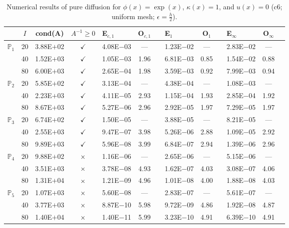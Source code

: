 \begin{table}[H]
\centering
\caption{Numerical results of pure diffusion for $\phi(x)=\exp(x)$, $\kappa(x)=1$, and $u(x)=0$ (c6; uniform mesh; $\epsilon=\frac{h}{2}$).}
\begin{tabular}{@{}l c c c l c c l c c l c c@{}}
\toprule
 & $I$ & cond(A) & $A^{-1}\geq 0$ &  E$_{c,1}$ & O$_{c,1}$ && E$_1$ & O$_1$ && E$_{\infty}$ & O$_{\infty}$\\
\midrule
\multirow{3}{*}{$\mathbb{P}_{1}$}
 & 20 & 3.88E$+$02 & $\checkmark$ & 4.08E$-$03 & --- && 1.23E$-$02 & --- && 2.83E$-$02 & ---\\
 & 40 & 1.52E$+$03 & $\checkmark$ & 1.05E$-$03 & 1.96 && 6.81E$-$03 & 0.85 && 1.54E$-$02 & 0.88\\
 & 80 & 6.00E$+$03 & $\checkmark$ & 2.65E$-$04 & 1.98 && 3.59E$-$03 & 0.92 && 7.99E$-$03 & 0.94\\
\midrule
\multirow{3}{*}{$\mathbb{P}_{2}$}
 & 20 & 5.85E$+$02 & $\checkmark$ & 3.13E$-$04 & --- && 4.38E$-$04 & --- && 1.08E$-$03 & ---\\
 & 40 & 2.23E$+$03 & $\checkmark$ & 4.11E$-$05 & 2.93 && 1.15E$-$04 & 1.93 && 2.85E$-$04 & 1.92\\
 & 80 & 8.67E$+$03 & $\checkmark$ & 5.27E$-$06 & 2.96 && 2.92E$-$05 & 1.97 && 7.29E$-$05 & 1.97\\
\midrule
\multirow{3}{*}{$\mathbb{P}_{3}$}
 & 20 & 6.74E$+$02 & $\checkmark$ & 1.50E$-$05 & --- && 3.88E$-$05 & --- && 8.21E$-$05 & ---\\
 & 40 & 2.55E$+$03 & $\checkmark$ & 9.47E$-$07 & 3.98 && 5.26E$-$06 & 2.88 && 1.09E$-$05 & 2.92\\
 & 80 & 9.89E$+$03 & $\checkmark$ & 5.96E$-$08 & 3.99 && 6.84E$-$07 & 2.94 && 1.39E$-$06 & 2.96\\
\midrule
\multirow{3}{*}{$\mathbb{P}_{4}$}
 & 20 & 9.88E$+$02 & $\times$ & 1.16E$-$06 & --- && 2.65E$-$06 & --- && 5.15E$-$06 & ---\\
 & 40 & 3.51E$+$03 & $\times$ & 3.78E$-$08 & 4.93 && 1.62E$-$07 & 4.03 && 3.08E$-$07 & 4.06\\
 & 80 & 1.31E$+$04 & $\times$ & 1.21E$-$09 & 4.96 && 1.01E$-$08 & 4.00 && 1.88E$-$08 & 4.03\\
\midrule
\multirow{3}{*}{$\mathbb{P}_{5}$}
 & 20 & 1.07E$+$03 & $\times$ & 5.60E$-$08 & --- && 2.83E$-$07 & --- && 5.61E$-$07 & ---\\
 & 40 & 3.77E$+$03 & $\times$ & 8.87E$-$10 & 5.98 && 9.72E$-$09 & 4.86 && 1.92E$-$08 & 4.87\\
 & 80 & 1.40E$+$04 & $\times$ & 1.40E$-$11 & 5.99 && 3.23E$-$10 & 4.91 && 6.39E$-$10 & 4.91\\
\bottomrule
\end{tabular}
\end{table}